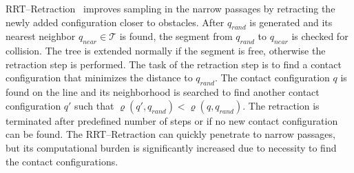 \documentclass{svmult}
\def\qrand{q_{rand}}
\def\qnear{q_{near}}
\def\T{\mathcal{T}}
\begin{document}
RRT--Retraction~\cite{zhangRetraction} improves sampling in the narrow passages by retracting the newly added configuration
closer to obstacles.
After $\qrand$ is generated and its nearest neighbor $\qnear\in \T$ is found, the segment from $\qrand$ to $\qnear$ is checked for collision.
The tree is extended normally if the segment is free, otherwise the retraction step is performed.
The task of the retraction step is to find a contact configuration  that minimizes the distance to $\qrand$.
The contact configuration $q$ is found on the line and its neighborhood is searched to find another contact configuration $q'$ such that 
$\varrho(q',\qrand) < \varrho(q,\qrand)$.
The retraction is terminated after predefined number of steps or if no new contact configuration can be found.
The RRT--Retraction can quickly penetrate to narrow passages, but its computational burden is significantly
increased due to necessity to find the contact configurations.

\end{document}
